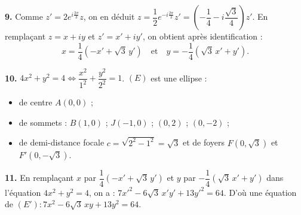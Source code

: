 \documentclass[11pt]{article}
\begin{document}
\textbf{9.} Comme $z' = 2e^{i\frac{2\pi}{3}}z$, on en déduit $z = \dfrac{1}{2}e^{-i\frac{2\pi}{3}}z' = \left(-\dfrac{1}{4} - i\dfrac{\sqrt{3}}{4}\right)z'$. En remplaçant $z = x + iy$ et $z' = x' + iy'$, on obtient après identification :
\[ x = \frac{1}{4}(-x' + \sqrt{3}\,y') \quad \text{et} \quad y = -\frac{1}{4}(\sqrt{3}\,x' + y'). \]

\textbf{10.} $4x^2 + y^2 = 4 \Longleftrightarrow \dfrac{x^2}{1^2} + \dfrac{y^2}{2^2} = 1$. $(E)$ est une ellipse :
\begin{itemize}
  \item de centre $A(0, 0)$ ;
  \item de sommets : $B(1, 0)$ ; $J(-1, 0)$ ; $(0, 2)$ ; $(0, -2)$ ;
  \item de demi-distance focale $c = \sqrt{2^2 - 1^2} = \sqrt{3}$ et de foyers $F(0, \sqrt{3})$ et $F'(0, -\sqrt{3})$.
\end{itemize}

\textbf{11.} En remplaçant $x$ par $\dfrac{1}{4}(-x' + \sqrt{3}\,y')$ et $y$ par $-\dfrac{1}{4}(\sqrt{3}\,x' + y')$ dans l'équation $4x^2 + y^2 = 4$, on a : $7x'^2 - 6\sqrt{3}\,x'y' + 13y'^2 = 64$. D'où une équation de $(E') : 7x^2 - 6\sqrt{3}\,xy + 13y^2 = 64$.
\end{document}
